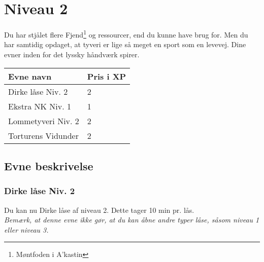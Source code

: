 \chapter*{Niveau 2}
Du har stjålet flere Fjend\footnote{Møntfoden i A'kastin} og ressourcer, end du kunne have brug for. Men du har samtidig opdaget, at tyveri er lige så meget en sport som en levevej. Dine evner inden for det lyssky håndværk spirer.

\begin{table}[H]
    \centering
    \begin{tabular}{|p{}|p{}|}
    \rowcolor{cerulean!80}\hline
        Evne navn & Pris i XP \\\hline
         Dirke låse Niv. 2 & 2 \\\hline
         Ekstra NK Niv. 1 & 1 \\\hline
         Lommetyveri Niv. 2 & 2 \\\hline
         Torturens Vidunder & 2 \\
         \hline
    \end{tabular}
\end{table}
\section*{Evne beskrivelse}

\subsection*{Dirke låse Niv. 2}
Du kan nu Dirke låse af niveau 2. Dette tager 10 min pr. lås.\\
\emph{Bemærk, at denne evne ikke gør, at du kan åbne andre typer låse, såsom niveau 1 eller niveau 3.}\\





